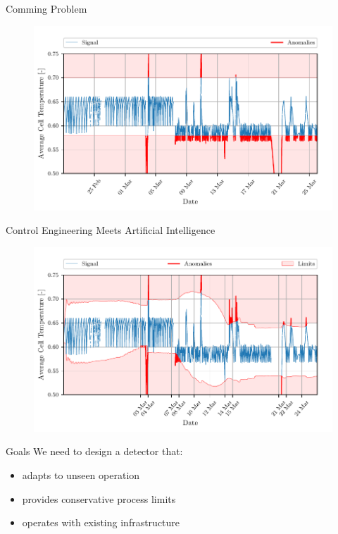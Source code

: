 \documentclass[aspectratio=169]{beamer}
\begin{document}
\begin{frame}{Comming Problem}
    \begin{figure}[htpb]
        \begin{center}
            \includegraphics[width=0.75\linewidth]{../ilustrate/pc2023/bess/naive/full_thresh.pdf}
        \end{center}
    \end{figure}
\end{frame}

\begin{frame}{Control Engineering Meets Artificial Intelligence}
    \begin{figure}[htpb]
        \begin{center}
            \includegraphics[width=0.75\linewidth]{../ilustrate/pc2023/bess/Average_Cell_Temperature_sliding_thresh.pdf}
        \end{center}
    \end{figure}
\end{frame}

\begin{frame}{Goals}
    We need to design a detector that:
    \begin{itemize}
        \item adapts to unseen operation
        \item provides conservative process limits
        \item operates with existing infrastructure
    \end{itemize}
\end{frame}
\end{document}
